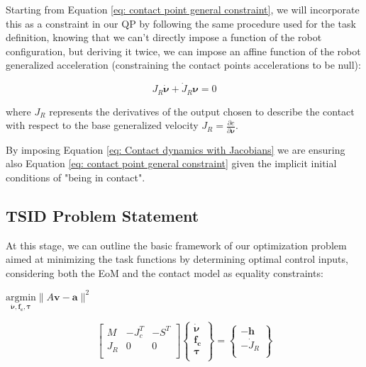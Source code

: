 Starting from Equation \eqref{eq: contact point general constraint}, we will incorporate this as a constraint in our QP by following the same procedure used for the task definition, knowing that we can't directly impose a function of the robot configuration, but deriving it twice, we can impose an affine function of the robot generalized acceleration (constraining the contact points accelerations to be null):

\begin{equation}
    {J_{R}}\dot{\bm{\nu}} + \dot{J}_{R}\bm{\nu} = 0
    \label{eq: Contact dynamics with Jacobians}
\end{equation}

where ${J_{R}}$ represents the derivatives of the output chosen to describe the contact with respect to the base generalized velocity ${J_{R}} = \frac{\partial c}{\partial \bm{\nu}}$. 

By imposing Equation \eqref{eq: Contact dynamics with Jacobians} we are ensuring also Equation \eqref{eq: contact point general constraint} given the implicit initial conditions of "being in contact".

\subsection{TSID Problem Statement}
\label{subsec:TSID Problem Statement}

At this stage, we can outline the basic framework of our optimization problem aimed at minimizing the task functions by determining optimal control inputs, considering both the EoM and the contact model as equality constraints:

\begin{center}
$\underset{\bm{\dot{\nu},f_{c},\bm{\tau}}}{\text{argmin}} \| A\mathbf{v} - \mathbf{a}\|^{2}$


\end{center}

\begin{equation}
\begin{bmatrix} 
M & -J_{c}^{T} & -S^{T}  \\
J_{R} & 0 & 0  \\
\end{bmatrix} 
\begin{Bmatrix} 
\bm{\dot{\nu}} \\
\mathbf{f_{c}} \\
\bm{\tau}  \\
\end{Bmatrix} 
= 
\begin{Bmatrix} 
-\mathbf{h} \\
-\dot{J}_{R} \\
\end{Bmatrix}
\label{eq: first QP-setup}
\end{equation}

